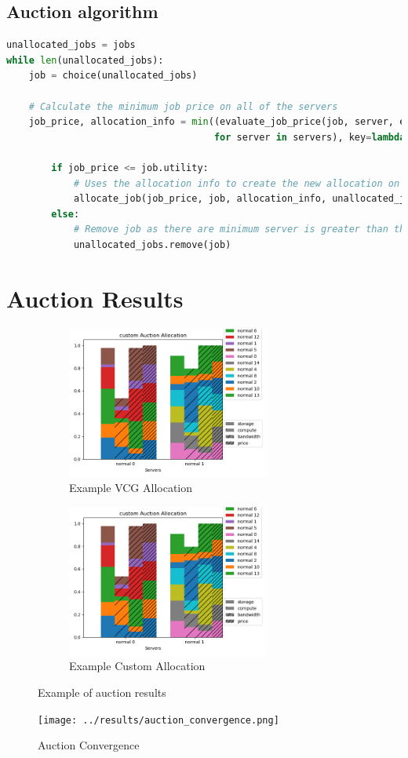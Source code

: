 \documentclass[fleqn]{article}
\begin{document}
\subsection{Auction algorithm}\label{subsec:auction-algorithm}
\begin{lstlisting}[language=Python]
unallocated_jobs = jobs
while len(unallocated_jobs):
    job = choice(unallocated_jobs)

    # Calculate the minimum job price on all of the servers
    job_price, allocation_info = min((evaluate_job_price(job, server, epsilon=epsilon)
                                     for server in servers), key=lambda bid: bid[0])

        if job_price <= job.utility:
            # Uses the allocation info to create the new allocation on the selected server
            allocate_job(job_price, job, allocation_info, unallocated_jobs)
        else:
            # Remove job as there are minimum server is greater than the job's utility
            unallocated_jobs.remove(job)
\end{lstlisting}
\section{Auction Results}\label{sec:auction-results}
\begin{figure}[H]
    \begin{subfigure}{0.5\textwidth}
        \includegraphics[width=1\linewidth, height=5cm]{../results/vcg_auction.png}
        \caption{Example VCG Allocation}
    \end{subfigure}
    \begin{subfigure}{0.5\textwidth}
        \includegraphics[width=1\linewidth, height=5cm]{../results/custom_auction.png}
        \caption{Example Custom Allocation}
    \end{subfigure}
    \caption{Example of auction results}
\end{figure}

\begin{figure}[H]
    \centering
    \texttt{[image: ../results/auction\_convergence.png]}
    \caption{Auction Convergence}
\end{figure}
\end{document}
